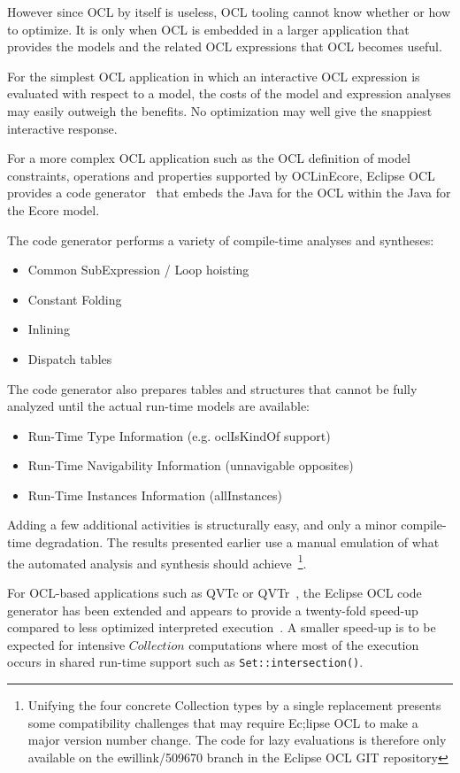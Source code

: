 \documentclass{llncs}
\begin{document}
However since OCL by itself is useless, OCL tooling cannot know whether or how to optimize. It is only when OCL is embedded in a larger application that provides the models and the related OCL expressions that OCL becomes useful.

For the simplest OCL application in which an interactive OCL expression is evaluated with respect to a model, the costs of the model and expression analyses may easily outweigh the benefits. No optimization may well give the snappiest interactive response.

For a more complex OCL application such as the OCL definition of model constraints, operations and properties supported by OCLinEcore, Eclipse OCL provides a code generator~\cite{OCL-CG} that embeds the Java for the OCL within the Java for the Ecore model.

The code generator performs a variety of compile-time analyses and syntheses:
\begin{itemize}
	\item Common SubExpression / Loop hoisting
	\item Constant Folding
	\item Inlining
	\item Dispatch tables
\end{itemize}

The code generator also prepares tables and structures that cannot be fully analyzed until
the actual run-time models are available:
\begin{itemize}
	\item Run-Time Type Information (e.g. oclIsKindOf support)
	\item Run-Time Navigability Information (unnavigable opposites)
	\item Run-Time Instances Information (allInstances)
\end{itemize}
Adding a few additional activities is structurally easy, and only a minor compile-time degradation. The results presented earlier use a manual emulation of what the automated analysis and synthesis should achieve~\footnote{Unifying the four concrete Collection types by a single replacement presents some compatibility challenges that may require Ec;lipse OCL to make a major version number change. The code for lazy evaluations is therefore only available on the ewillink/509670 branch in the Eclipse OCL GIT repository}.

For OCL-based applications such as QVTc or QVTr~\cite{QVT-1.3}, the Eclipse OCL code generator has been extended and appears to provide a twenty-fold speed-up compared to less optimized interpreted execution~\cite{Willink-EXE2016}. A smaller speed-up is to be expected for intensive $Collection$ computations where most of the execution occurs in shared run-time support such as \verb$Set::intersection()$.
\end{document}
